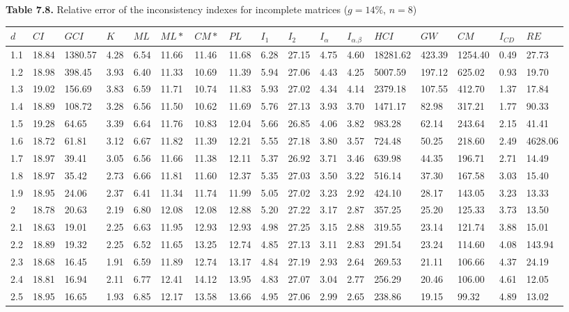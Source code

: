 \newpage
\textbf{Table 7.8.} Relative error of the inconsistency indexes for incomplete matrices ($g=14\%$, $n=8$)
\begin{adjustbox}{angle=90}
  \begin{center}
    \begin{tabular}{|l|llllllllllllllll|}
      \hline $d$ &
$CI$&$	\textit{GCI}$&$K$&$ML$&$ML*$&$CM*$&$PL$&$I_1$&$I_2$&$I_{\alpha}$&$I_{\alpha.\beta}$&$HCI$&$GW$&$CM$&$I_{CD}$&$RE$\\ \hline \hline
1.1&18.84&1380.57&4.28&6.54&11.66&11.46&11.68&6.28&27.15&4.75&4.60&18281.62&423.39&1254.40&0.49&27.73  \\ 
1.2&18.98&398.45&3.93&6.40&11.33&10.69&11.39&5.94&27.06&4.43&4.25&5007.59&197.12&625.02&0.93&19.70  \\ 
1.3&19.02&156.69&3.83&6.59&11.71&10.74&11.83&5.93&27.02&4.34&4.14&2379.18&107.55&412.70&1.37&17.84  \\ 
1.4&18.89&108.72&3.28&6.56&11.50&10.62&11.69&5.76&27.13&3.93&3.70&1471.17&82.98&317.21&1.77&90.33  \\ 
1.5&19.28&64.65&3.39&6.64&11.76&10.83&12.04&5.66&26.85&4.06&3.82&983.28&62.14&243.64&2.15&41.41  \\ 
1.6&18.72&61.81&3.12&6.67&11.82&11.39&12.21&5.55&27.18&3.80&3.57&724.48&50.25&218.60&2.49&4628.06  \\ 
1.7&18.97&39.41&3.05&6.56&11.66&11.38&12.11&5.37&26.92&3.71&3.46&639.98&44.35&196.71&2.71&14.49  \\ 
1.8&18.97&35.42&2.73&6.66&11.81&11.60&12.37&5.35&27.03&3.50&3.22&516.14&37.30&167.58&3.03&15.40  \\ 
1.9&18.95&24.06&2.37&6.41&11.34&11.74&11.99&5.05&27.02&3.23&2.92&424.10&28.17&143.05&3.23&13.33  \\ 
2&18.78&20.63&2.19&6.80&12.08&12.08&12.88&5.20&27.22&3.17&2.87&357.25&25.20&125.33&3.73&13.50  \\ 
2.1&18.63&19.01&2.25&6.63&11.95&12.93&12.93&4.98&27.25&3.15&2.88&319.55&23.14&121.74&3.88&15.01  \\ 
2.2&18.89&19.32&2.25&6.52&11.65&13.25&12.74&4.85&27.13&3.11&2.83&291.54&23.24&114.60&4.08&143.94  \\ 
2.3&18.68&16.45&1.91&6.59&11.89&12.74&13.17&4.84&27.19&2.93&2.64&269.53&21.11&106.66&4.37&24.19  \\ 
2.4&18.81&16.94&2.11&6.77&12.41&14.12&13.95&4.83&27.07&3.04&2.77&256.29&20.46&106.00&4.61&12.05  \\ 
2.5&18.95&16.65&1.93&6.85&12.17&13.58&13.66&4.95&27.06&2.99&2.65&238.86&19.15&99.32&4.89&13.02  \\ 

\end{tabular}
\end{center}
\end{adjustbox}
